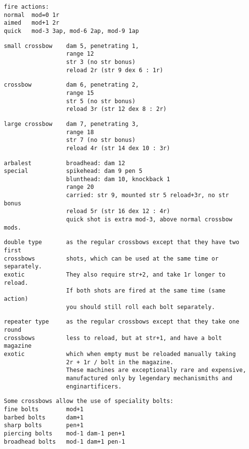 \begin{samepage}
\begin{verbatim}
fire actions:
normal  mod=0 1r
aimed   mod+1 2r
quick   mod-3 3ap, mod-6 2ap, mod-9 1ap
\end{verbatim} \blocklistgap \begin{verbatim}
small crossbow    dam 5, penetrating 1,
                  range 12
                  str 3 (no str bonus)
                  reload 2r (str 9 dex 6 : 1r)
\end{verbatim} \blocklistgap \begin{verbatim}
crossbow          dam 6, penetrating 2,
                  range 15
                  str 5 (no str bonus)
                  reload 3r (str 12 dex 8 : 2r)
\end{verbatim} \blocklistgap \begin{verbatim}
large crossbow    dam 7, penetrating 3,
                  range 18
                  str 7 (no str bonus)
                  reload 4r (str 14 dex 10 : 3r)
\end{verbatim} \blocklistgap \begin{verbatim}
arbalest          broadhead: dam 12
special           spikehead: dam 9 pen 5
                  blunthead: dam 10, knockback 1
                  range 20
                  carried: str 9, mounted str 5 reload+3r, no str bonus
                  reload 5r (str 16 dex 12 : 4r)
                  quick shot is extra mod-3, above normal crossbow mods.
\end{verbatim} \blocklistgap \begin{verbatim}
double type       as the regular crossbows except that they have two first
crossbows         shots, which can be used at the same time or separately.
exotic            They also require str+2, and take 1r longer to reload.
                  If both shots are fired at the same time (same action)
                  you should still roll each bolt separately.
\end{verbatim} \blocklistgap \begin{verbatim}
repeater type     as the regular crossbows except that they take one round
crossbows         less to reload, but at str+1, and have a bolt magazine
exotic            which when empty must be reloaded manually taking
                  2r + 1r / bolt in the magazine.
                  These machines are exceptionally rare and expensive,
                  manufactured only by legendary mechanismiths and
                  enginartificers.
\end{verbatim} \blocklistgap \begin{verbatim}
Some crossbows allow the use of speciality bolts:
fine bolts        mod+1
barbed bolts      dam+1
sharp bolts       pen+1
piercing bolts    mod-1 dam-1 pen+1
broadhead bolts   mod-1 dam+1 pen-1
\end{verbatim} \end{samepage} \normalsize \goodbreak

